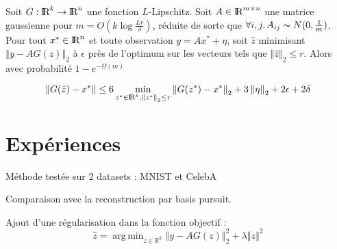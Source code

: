 \documentclass{beamer}
\def\R{\textrm{I\kern-0.21emR}}
\DeclareMathOperator*{\argmin}{arg\,min}
\newcommand{\norm}[1]{\left\Vert #1\right\Vert}
\begin{document}
\begin{frame}{\secname}
    \begin{theorem}
 Soit $G : \R^k \rightarrow \R^n$ une fonction $L$-Lipschitz. Soit $A \in \R^{m \times n}$ une matrice gaussienne pour  $m = O(k \log \frac{Lr}{\delta})$, réduite de sorte que $\forall i,j, A_{ij} \thicksim N(0, \frac{1}{m})$. Pour tout $x^* \in \R^n$ et toute observation $y = Ax^* + \eta$, soit $\hat{z}$ minimisant $\norm{y - AG(z)}_2$ à $\epsilon$ près de l'optimum sur les vecteurs tels que $\norm{\hat{z}}_2 \leq r$. Alors avec probabilité $1 - e^{- \Omega(m)}$
 
 $$ \norm{G(\hat{z}) - x^*} \leq 6 \min_{z^* \in \R^k, \norm{z^*}_2 \leq r} \norm{G(z^*) - x^*}_2 +3\norm{\eta}_2 + 2\epsilon + 2\delta$$
 
\end{theorem}

\end{frame}












\section{Expériences}

\begin{frame}{\secname}
Méthode testée sur 2 datasets : MNIST et CelebA
\vspace{2em}

Comparaison avec la reconstruction par basis pursuit.
\vspace{2em}

Ajout d'une régularisation dans la fonction objectif : $$ \hat{z} = \argmin_{z\in \mathbb R^k} \norm{y - AG(z)}_2^2 + \lambda \norm{z}^2$$
\vspace{2em}


\end{frame}
\end{document}

